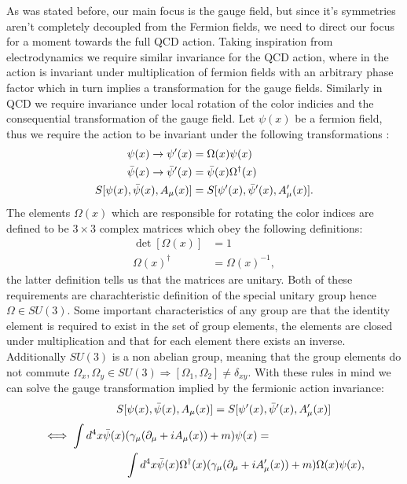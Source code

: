 \documentclass[english,twoside,openright]{UH_TCM_MSc}
\begin{document}
As was stated before, our main focus is the gauge field, but since it's symmetries aren't completely decoupled from the Fermion fields, we need to direct our focus for a moment towards the full QCD action. Taking inspiration from electrodynamics we require similar invariance for the QCD action, where in the action is invariant under multiplication of fermion fields with an arbitrary phase factor which in turn implies a transformation for the gauge fields. Similarly in QCD we require invariance under local rotation of the color indicies and the consequential transformation of the gauge field. Let $\psi(x)$ be a fermion field, thus we require the action to be invariant under the following transformations \cite[p.~28]{gattringer2009quantum}:
\begin{align}
    \psi(x) \rightarrow \psi'(x) &= \Omega(x)\psi(x) \\
    \Bar{\psi}(x) \rightarrow \Bar{\psi}'(x) &= \Bar{\psi}(x)\Omega^\dagger(x) \\
    S[\psi(x),\Bar{\psi}(x),A_\mu(x)] &= S[\psi'(x),\Bar{\psi}'(x),A'_\mu(x)].
\end{align}
The elements $\Omega(x)$ which are responsible for rotating the color indices are defined to be $3\times 3$ complex matrices which obey the following definitions:
\begin{align}
    \det[\Omega(x)] &= 1 \\
    \Omega(x)^\dagger &= \Omega(x)^{-1}, \label{eq:2.6}
\end{align}
the latter definition tells us that the matrices are unitary. Both of these requirements are charachteristic definition of the special unitary group hence $\Omega \in SU(3)$. Some important characteristics of any group are that the identity element is required to exist in the set of group elements, the elements are closed under multiplication and that for each element there exists an inverse. Additionally $SU(3)$ is a non abelian group, meaning that the group elements do not commute $\Omega_x,\Omega_y \in SU(3) \Rightarrow [\Omega_1,\Omega_2]\neq \delta_{xy}$. With these rules in mind we can solve the gauge transformation implied by the fermionic action invariance:
\begin{align}
    \hspace{36px}S[\psi(x),\Bar{\psi}(x),A_\mu(x)] = S[\psi'(x),\Bar{\psi}'(x),A'_\mu(x)]
\end{align}
\begin{align}
     \iff \int d^4x \Bar{\psi}(x)&(\gamma_\mu(\partial_\mu + iA_\mu(x)) + m)\psi(x)  = \\
     &\int d^4x \Bar{\psi}(x) \Omega^\dagger(x)(\gamma_\mu(\partial_\mu + iA'_\mu(x)) + m)\Omega(x)\psi(x),
\end{align}
\end{document}
